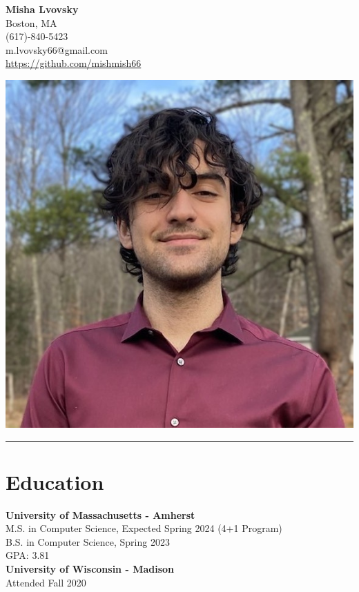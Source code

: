 \documentclass[letterpaper, 10pt]{article}
\begin{document}
\noindent
\begin{minipage}{.65\textwidth}
    \LARGE \textbf{Misha Lvovsky}\\
    \normalsize
    Boston, MA \\
    (617)-840-5423 \\
    m.lvovsky66@gmail.com \\
    \url{https://github.com/mishmish66}
\end{minipage}
\hfill
\begin{minipage}{.3\textwidth}
    \includegraphics[width=\linewidth]{portrait.jpg}
\end{minipage}
\noindent\rule{\textwidth}{0.5pt}

\section*{Education}
\noindent
\textbf{University of Massachusetts - Amherst} \\
M.S. in Computer Science, Expected Spring 2024 (4+1 Program) \\
B.S. in Computer Science, Spring 2023 \\
GPA: 3.81 \\
\noindent
\textbf{University of Wisconsin - Madison} \\
Attended Fall 2020
\end{document}
